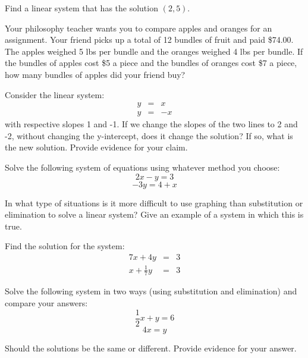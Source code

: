\begin{exercise}
	Find a linear system that has the solution $(2,5)$.
\end{exercise}
\bigskip

\begin{exercise}
Your philosophy teacher wants you to compare apples and oranges for an assignment. Your friend picks up a total of 12 bundles of fruit and paid \$74.00. The apples weighed 5 lbs per bundle and the oranges weighed 4 lbs per bundle. If the bundles of apples cost \$5 a piece and the bundles of oranges cost \$7 a piece, how many bundles of apples did your friend buy?
\end{exercise}
\bigskip

\begin{exercise}
Consider the linear system:
$$
\begin{array}{rcc}
y& = & x \\
y & = & -x 	
\end{array}
$$
with respective slopes 1 and -1. If we change the slopes of the two lines to 2 and -2, without changing the y-intercept, does it change the solution? If so, what is the new solution. Provide evidence for your claim. 	
\end{exercise}

\bigskip

\begin{exercise}
Solve the following system of equations using whatever method you choose:
$$
2x-y = 3
$$
$$
-3y = 4 +x
$$	
\end{exercise}

\bigskip

\begin{exercise}
	In what type of situations is it more difficult to use graphing than substitution or elimination to solve a linear system? Give an example of a system in which this is true. 
\end{exercise}

\bigskip

\begin{exercise}
Find the solution for the system:
$$
\begin{array}{rcl}
7x + 4y & = & 3 \\
x + \frac{1}{7}y & = & 3	
\end{array}
$$
\end{exercise}
\bigskip

\begin{exercise}
Solve the following system in two ways (using substitution and elimination) and compare your answers:
$$
\frac{1}{2}x + y = 6
$$	
$$
4x =y
$$

Should the solutions be the same or different. Provide evidence for your answer.
\end{exercise}

